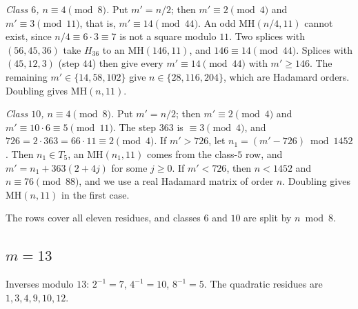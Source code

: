 \documentclass[10pt]{article}
\theoremstyle{remark}
\newcommand{\MH}{\mathrm{MH}}
\begin{document}
\emph{Class $6$, $n\equiv4\pmod8$.} Put $m'=n/2$; then $m'\equiv2\pmod4$ and $m'\equiv3\pmod{11}$, that is, $m'\equiv14\pmod{44}$. An odd $\MH(n/4,11)$ cannot exist, since $n/4\equiv6\cdot3\equiv7$ is not a square modulo $11$. Two splices with $(56,45,36)$ take $H_{36}$ to an $\MH(146,11)$, and $146\equiv14\pmod{44}$. Splices with $(45,12,3)$ (step $44$) then give every $m'\equiv14\pmod{44}$ with $m'\ge146$. The remaining $m'\in\{14,58,102\}$ give $n\in\{28,116,204\}$, which are Hadamard orders. Doubling gives $\MH(n,11)$.

\emph{Class $10$, $n\equiv4\pmod8$.} Put $m'=n/2$; then $m'\equiv2\pmod4$ and $m'\equiv10\cdot6\equiv5\pmod{11}$. The step $363$ is $\equiv3\pmod4$, and $726=2\cdot363=66\cdot11\equiv2\pmod4$. If $m'>726$, let $n_1=(m'-726)\bmod1452$. Then $n_1\in T_5$, an $\MH(n_1,11)$ comes from the class-$5$ row, and $m'=n_1+363(2+4j)$ for some $j\ge0$. If $m'<726$, then $n<1452$ and $n\equiv76\pmod{88}$, and we use a real Hadamard matrix of order $n$. Doubling gives $\MH(n,11)$ in the first case.

The rows cover all eleven residues, and classes $6$ and $10$ are split by $n\bmod8$.

\subsection{\texorpdfstring{$m=13$}{m = 13}}
Inverses modulo $13$: $2^{-1}=7$, $4^{-1}=10$, $8^{-1}=5$. The quadratic residues are $1,3,4,9,10,12$.
\end{document}
